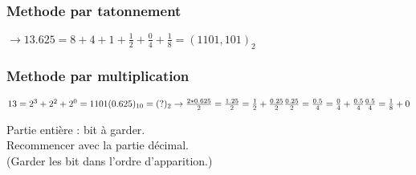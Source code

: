 \documentclass[12pt]{article}
\begin{document}
\subsubsection*{Methode par tatonnement}
$ \rightarrow 13.625 = 8 + 4 + 1 + \frac{1}{2} + \frac{0}{4} + \frac{1}{8} = (1101,101)_2$

\subsubsection*{Methode par multiplication}

$ 13 = 2^{3} + 2^{2} + 2^{0} = 1101 \\
(0.625)_{10} = (?)_2 \rightarrow \frac{2*0.625}{2} = \frac{1.25}{2} = \frac{1}{2} + \frac{0.25}{2} \\
\frac{0.25}{2} = \frac{0.5}{4} = \frac{0}{4} + \frac{0.5}{4} \\
\frac{0.5}{4} = \frac{1}{8} + 0$
\vspace{10pt}

Partie entière : bit à garder. \\
Recommencer avec la partie décimal. \\
(Garder les bit dans l'ordre d'apparition.)
\end{document}
